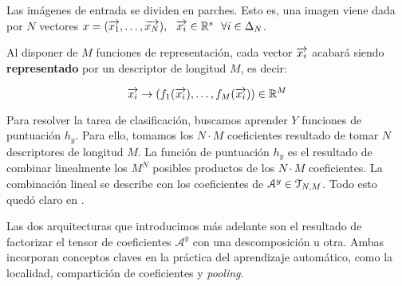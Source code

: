 Las imágenes de entrada se dividen en parches. Esto es, una imagen viene dada por $N$ vectores $x = (\overrightarrow{x_1}, \ldots, \overrightarrow{x_N}), \ \  \overrightarrow{x_i} \in \mathbb{R}^s \ \  \forall i \in \Delta_{N}$.

Al disponer de $M$ funciones de representación, cada vector $\overrightarrow{x_i}$ acabará siendo \textbf{representado} por un descriptor de longitud $M$, es decir:

\begin{equation}
	\overrightarrow{x_i} \to (f_1(\overrightarrow{x_i}), \ldots, f_M(\overrightarrow{x_i})) \in \mathbb{R}^M
\end{equation}

Para resolver la tarea de clasificación, buscamos aprender $Y$ funciones de puntuación $h_y$. Para ello, tomamos los $N \cdot M$ coeficientes resultado de tomar $N$ descriptores de longitud $M$. La función de puntuación $h_y$ es el resultado de combinar linealmente los $M^N$ posibles productos de los $N \cdot M$ coeficientes. La combinación lineal se describe con los coeficientes de $\mathcal{A}^y \in \mathcal{T}_{N, M}$. Todo esto quedó claro en .

Las dos arquitecturas que introducimos más adelante son el resultado de factorizar el tensor de coeficientes $\mathcal{A}^y$ con una descomposición u otra. Ambas incorporan conceptos claves en la práctica del aprendizaje automático, como la localidad, compartición de coeficientes y \textit{pooling}.
